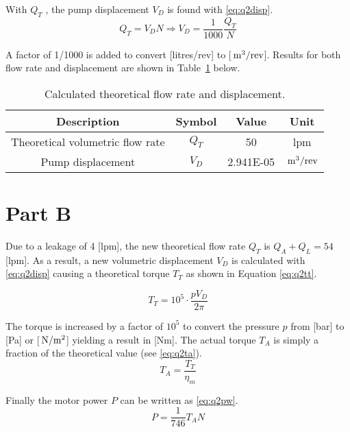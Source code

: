 With $Q_T$ , the pump displacement $V_D$ is found with \ref{eq:q2disp}.
\begin{equation}
	\label{eq:q2disp}
	Q_T = V_D N \Rightarrow V_D = \frac{1}{1000}\frac{Q_T}{N}
\end{equation}

A factor of 1/1000 is added to convert [litres/rev] to [$\,\mathrm{m^3/rev}$]. Results for both flow rate and displacement are shown in Table~\ref{tab:q2a} below.

\begin{table}[H]
  \centering
  \caption{Calculated theoretical flow rate and displacement.}
    \begin{tabular}{cccc}
    \toprule
    \textbf{Description} & \textbf{Symbol} & \textbf{Value } & \textbf{Unit} \\
    \midrule
    Theoretical volumetric flow rate & $Q_T$ & 50    & lpm \\
    Pump displacement & $V_D$ & 2.941E-05 & $\,\mathrm{m^3/rev}$ \\
    \bottomrule
    \end{tabular}
  \label{tab:q2a}
\end{table}


\section{Part B}
\label{sect:2b}

Due to a leakage of 4 [lpm], the new theoretical flow rate $Q_T$ is $Q_A+Q_L=54$ [lpm]. As a result, a new volumetric displacement $V_D$ is calculated with \ref{eq:q2disp} causing a theoretical torque $T_T$ as shown in Equation \ref{eq:q2tt}.

\begin{equation}
	\label{eq:q2tt}
	T_T = 10^5 \cdot \frac{p V_D}{2 \pi}
\end{equation}

The torque is increased by a factor of $10^5$ to convert the pressure $p$ from [bar] to [Pa] or [$\,\mathrm{N/m^2}$] yielding a result in [Nm]. The actual torque $T_A$ is simply a fraction of the theoretical value (see \ref{eq:q2ta}).
\begin{equation}
	\label{eq:q2ta}
	T_A = \frac{T_T}{\eta_m}
\end{equation}

Finally the motor power $P$ can be written as \ref{eq:q2pw}.
\begin{equation}
	\label{eq:q2pw}
	P = \frac{1}{746} T_A N
\end{equation}

